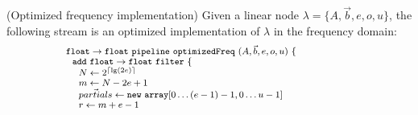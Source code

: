 \begin{transformation} \label{trans:freq1}
(Optimized frequency implementation)
Given a linear node $\lambda = \{A, {\vec b}, e, o, u\}$, the
following stream is an optimized implementation of $\lambda$ in the
frequency domain:
\begin{equation} \nonumber
{\small
  \begin{array}{ll}
    {\tt float \rightarrow float}~{\tt pipeline~optimizedFreq~}(A, {\vec b}, e, o, u){\tt ~\{} & \hspace{40pt}\\
    ~~{\tt add~float \rightarrow float~filter~\{}\\
    ~~~~N \leftarrow 2^{\lceil \lg(2e) \rceil} \\
    ~~~~m \leftarrow N-2e+1 \\
    ~~~~\vec{partials} \leftarrow {\tt new~array}[0 \dots (e-1)-1, 0\dots u-1] \\
    ~~~~r \leftarrow m+e-1 \\
\end{array}
}
\end{equation}
\end{transformation}

